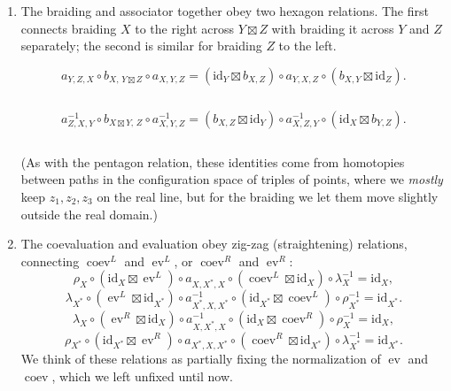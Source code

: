 \documentclass[12pt,letterpaper,reqno]{amsart}
\numberwithin{equation}{section}
\newcommand{\ti}[1]{\textit{#1}}
\DeclareMathOperator{\ev}{ev}
\DeclareMathOperator{\coev}{coev}
\begin{document}
\begin{enumerate}
\item The braiding and associator together obey two hexagon relations.
The first connects braiding $X$ to the right across $Y \boxtimes Z$
with braiding it across $Y$ and $Z$ separately;
the second is similar for braiding $Z$ to the left.


\[
a_{Y,Z,X}\circ b_{X,\,Y\boxtimes Z}\circ a_{X,Y,Z}
=
(\mathrm{id}_Y\boxtimes b_{X,Z})\circ a_{Y,X,Z}\circ (b_{X,Y}\boxtimes \mathrm{id}_Z).
\]

\[

\]

\[
a^{-1}_{Z,X,Y}\circ b_{X\boxtimes Y,\,Z}\circ a^{-1}_{X,Y,Z}
=
(b_{X,Z}\boxtimes \mathrm{id}_Y)\circ a^{-1}_{X,Z,Y}\circ (\mathrm{id}_X\boxtimes b_{Y,Z}).
\]

\[

\]

(As with the pentagon relation, these identities come 
from homotopies between paths in the configuration
space of triples of points, where we \ti{mostly} keep
$z_1, z_2, z_3$ on the real line, but for the braiding we let them move slightly outside the real domain.)
\item The coevaluation and evaluation obey zig-zag (straightening) relations, connecting $\coev^L$ and $\ev^L$,
or $\coev^R$ and $\ev^R$:
\begin{equation} \label{eq:zigzag-1}
\rho_X\circ(\mathrm{id}_X\boxtimes \ev^L)\circ a_{X,X^*,X}\circ(\coev^L\boxtimes \mathrm{id}_X)\circ \lambda_X^{-1}
=\mathrm{id}_X,
\end{equation}
\begin{equation} \label{eq:zigzag-2}
\lambda_{X^*}\circ(\ev^L\boxtimes \mathrm{id}_{X^*})\circ a^{-1}_{X^*,X,X^*}\circ(\mathrm{id}_{X^*}\boxtimes \coev^L)\circ \rho_{X^*}^{-1}
=\mathrm{id}_{X^*}.
\end{equation}
\begin{equation} \label{eq:zigzag-3}
\lambda_X\circ(\ev^R\boxtimes \mathrm{id}_X)\circ a^{-1}_{X,X^*,X}\circ(\mathrm{id}_X\boxtimes \coev^R)\circ \rho_X^{-1}
=\mathrm{id}_X,
\end{equation}
\begin{equation} \label{eq:zigzag-4}
\rho_{X^*}\circ(\mathrm{id}_{X^*}\boxtimes \ev^R)\circ a_{X^*,X,X^*}\circ(\coev^R\boxtimes \mathrm{id}_{X^*})\circ \lambda_{X^*}^{-1}
=\mathrm{id}_{X^*}.
\end{equation}
We think of these relations as partially fixing the normalization
of $\ev$ and $\coev$, which we left unfixed until now.


\end{enumerate}
\end{document}
